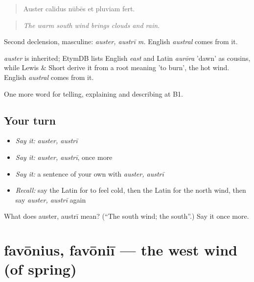 \begin{quote}
Auster calidus nūbēs et pluviam fert.
\end{quote}

\begin{quote}
\emph{The warm south wind brings clouds and rain.}
\end{quote}

Second declension, masculine: \emph{auster, austrī m.} English \emph{austral} comes from it.

\begin{cousinweb}
\emph{auster} is inherited; EtymDB lists English \emph{east} and Latin \emph{aurōra} 'dawn' as cousins, while Lewis \& Short derive it from a root meaning 'to burn', the hot wind. English \emph{austral} comes from it.
\end{cousinweb}

\begin{grammarlens}[title={What you've built}]
One more word for telling, explaining and describing at B1.
\end{grammarlens}

\subsection*{Your turn}
\begin{itemize}
\raggedright
  \item \emph{Say it:} \emph{auster, austrī}
  \item \emph{Say it:} \emph{auster, austrī}, once more
  \item \emph{Say it:} a sentence of your own with \emph{auster, austrī}
  \item \emph{Recall:} say the Latin for to feel cold, then the Latin for the north wind, then say \emph{auster, austrī} again
\end{itemize}

\begin{tcolorbox}[breakable,colback=teal!4,colframe=teal!35!black,title={Before you move on}]
What does auster, austrī mean? (\textquotedblleft{}The south wind; the south\textquotedblright{}.) Say it once more.
\end{tcolorbox}
\section[favōnius, favōniī]{favōnius, favōniī — the west wind (of spring)}

\label{lesson:LA-C487-favonius}



